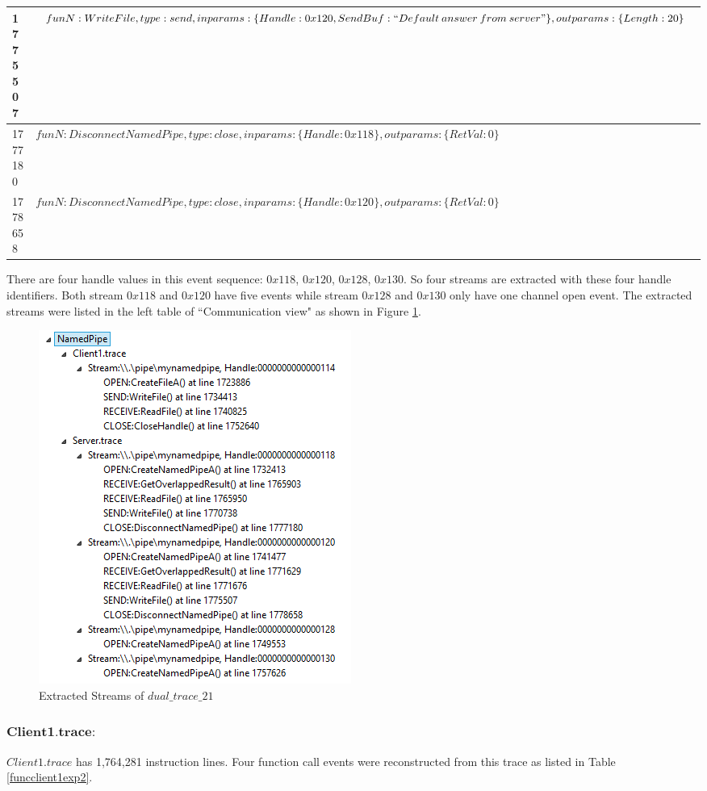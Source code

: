 \begin{table}[H]
\begin{tabular}{|l|p{16cm}|}
\hline
  1775507 & $funN:WriteFile, type:send, inparams:\lbrace Handle:0x120, SendBuf:``Default\: answer\: from\: server"\rbrace, outparams: \lbrace Length:20 \rbrace$\\
\hline
 1777180&$funN:DisconnectNamedPipe, type:close, inparams: \lbrace Handle:0x118 \rbrace, outparams: \lbrace RetVal:0 \rbrace$\\
\hline   
 1778658&$funN:DisconnectNamedPipe, type:close, inparams: \lbrace Handle:0x120 \rbrace, outparams: \lbrace RetVal:0 \rbrace$\\
\hline               
  \end{tabular}
\end{table}

There are four handle values in this event sequence: $0x118$, $0x120$, $0x128$, $0x130$. So four streams are extracted with these four handle identifiers. Both stream $0x118$ and $0x120$ have five events while stream $0x128$ and $0x130$ only have one channel open event. The extracted streams were listed in the left table  of ``Communication view"  as shown in Figure \ref{result21_streams}.

\begin{figure}[H]
\centerline{\includegraphics{Figures/result21_streams}}
 \caption{Extracted Streams of $dual\_trace\_21$}
\label{result21_streams}
\end{figure}

\subsubsection{$\boldsymbol{Client1.trace:}$}
$Client1.trace$ has 1,764,281 instruction lines. Four function call events were reconstructed from this trace as listed in Table \ref{funcclient1exp2}.

